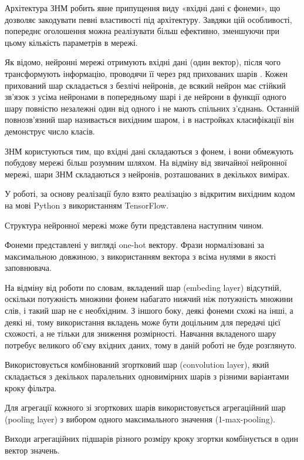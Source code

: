 Архітектура ЗНМ робить явне припущення виду «вхідні дані є фонеми», що дозволяє закодувати певні властивості під архітектуру. Завдяки цій особливості, попереднє оголошення можна реалізувати більш ефективно, зменшуючи при цьому кількість параметрів в мережі.

Як відомо, нейронні мережі отримують вхідні дані (один вектор), після чого трансформують інформацію, проводячи її через ряд прихованих шарів \cite{Kim_2014, Zhang_2016}. Кожен прихований шар складається з безлічі нейронів, де всякий нейрон має стійкий зв’язок з усіма нейронами в попередньому шарі і де нейрони в функції одного шару повністю незалежні один від одного і не мають спільних з’єднань. Останній повнозв’язний шар називається вихідним шаром, і в настройках класифікації він демонструє число класів.

ЗНМ користуються тим, що вхідні дані складаються з фонем, і вони обмежують побудову мережі більш розумним шляхом. На відміну від звичайної нейронної мережі, шари ЗНМ складаються з нейронів, розташованих в декількох вимірах.

У роботі, за основу реалізації було взято реалізацію з відкритим вихідним кодом \cite{Britz_2015} на мові Python з використанням TensorFlow.

Структура нейронної мережі може бути представлена наступним чином.

Фонеми представлені у вигляді one-hot вектору. Фрази нормалізовані за максимальною довжиною, з використанням вектора з всіма нулями в якості заповнювача.

На відміну від роботи по словам, вкладений шар (embeding layer) відсутній, оскільки потужність множини фонем набагато нижчий ніж потужність множини слів, і такий шар не є необхідним. З іншого боку, деякі фонеми схожі на інші, а деякі ні, тому використання вкладень може бути доцільним для передачі цієї схожості, а не тільки для зниження розмірності. Навчання вкладеного шару потребує великого об’єму вхідних даних, тому в даній роботі не буде розглянуто.

Використовується комбінований згортковий шар (convolution layer), який складається з декількох паралельних одновимірних шарів з різними варіантами кроку фільтра.

Для агрегації кожного зі згорткових шарів використовується агрегаційний шар (pooling layer) з вибором одного максимального значення (1-max-pooling).

Виходи агрегаційних підшарів різного розміру кроку згортки комбінується в один вектор значень.

